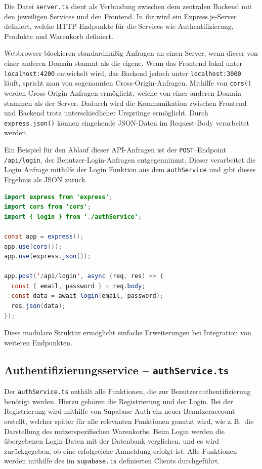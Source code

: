 \documentclass[oneside]{ausarbeitung}
\begin{document}
Die Datei \texttt{server.ts} dient als Verbindung zwischen dem zentralen Backend mit den jeweiligen Services und den Frontend. In ihr wird ein Express.js-Server definiert, welche HTTP-Endpunkte für die Services wie Authentifizierung, Produkte und Warenkorb definiert.

Webbrowser blockieren standardmäßig Anfragen an einen Server, wenn dieser von einer anderen Domain stammt als die eigene. Wenn das Frontend lokal unter \texttt{localhost:4200} entwickelt wird, das Backend jedoch unter \texttt{localhost:3000} läuft, spricht man von sogenannten Cross-Origin-Anfragen.
Mithilfe von \texttt{cors()} werden Cross-Origin-Anfragen ermöglicht, welche von einer anderen Domain stammen als der Server. Dadurch wird die Kommunikation zwischen Frontend und Backend trotz unterschiedlicher Ursprünge ermöglicht.
Durch \texttt{express.json()} können eingehende JSON-Daten im Request-Body verarbeitet werden.

Ein Beispiel für den Ablauf dieser API-Anfragen ist der \texttt{POST}–Endpoint \texttt{/api/login}, der Benutzer-Login-Anfragen entgegennimmt. Dieser verarbeitet die Login Anfrage mithilfe der Login Funktion aus dem \texttt{authService} und gibt dieses Ergebnis als JSON zurück. 


\begin{lstlisting}[language=Java, caption={Auszug aus \texttt{server.ts}}]
import express from 'express';
import cors from 'cors';
import { login } from './authService';

const app = express();
app.use(cors());
app.use(express.json());

app.post('/api/login', async (req, res) => {
  const { email, password } = req.body;
  const data = await login(email, password);
  res.json(data);
});
\end{lstlisting}

Diese modulare Struktur ermöglicht einfache Erweiterungen bei Integration von weiteren Endpunkten. 

\subsection{Authentifizierungsservice – \texttt{authService.ts}}

Der \texttt{authService.ts} enthält alle Funktionen, die zur Benutzerauthentifizierung benötigt werden. Hierzu gehören die Registrierung und der Login. Bei der Registrierung wird mithilfe von Supabase Auth ein neuer Benutzeraccount erstellt, welcher später für alle relevanten Funktionen genutzt wird, wie z.\,B.\ die Darstellung des nutzerspezifischen Warenkorbs. Beim Login werden die übergebenen Login-Daten mit der Datenbank verglichen, und es wird zurückgegeben, ob eine erfolgreiche Anmeldung erfolgt ist.
Alle Funktionen werden mithilfe des im \texttt{supabase.ts} definierten Clients durchgeführt.
\end{document}
